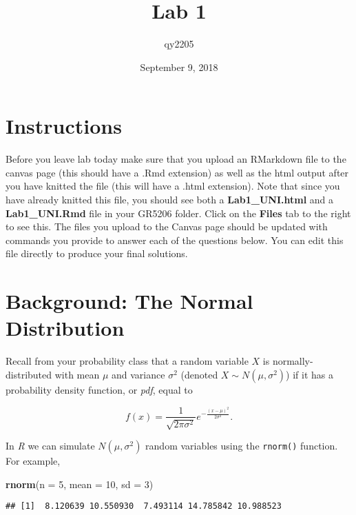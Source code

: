 \documentclass[]{article}
\title{Lab 1}
\author{qy2205}
\date{September 9, 2018}
\newenvironment{Shaded}{\begin{snugshade}}{\end{snugshade}}
\newcommand{\KeywordTok}[1]{\textcolor[rgb]{0.13,0.29,0.53}{\textbf{#1}}}
\newcommand{\DataTypeTok}[1]{\textcolor[rgb]{0.13,0.29,0.53}{#1}}
\newcommand{\DecValTok}[1]{\textcolor[rgb]{0.00,0.00,0.81}{#1}}
\newcommand{\NormalTok}[1]{#1}
\begin{document}
\maketitle

\section{Instructions}\label{instructions}

Before you leave lab today make sure that you upload an RMarkdown file
to the canvas page (this should have a .Rmd extension) as well as the
html output after you have knitted the file (this will have a .html
extension). Note that since you have already knitted this file, you
should see both a \textbf{Lab1\_UNI.html} and a \textbf{Lab1\_UNI.Rmd}
file in your GR5206 folder. Click on the \textbf{Files} tab to the right
to see this. The files you upload to the Canvas page should be updated
with commands you provide to answer each of the questions below. You can
edit this file directly to produce your final solutions.

\section{Background: The Normal
Distribution}\label{background-the-normal-distribution}

Recall from your probability class that a random variable \(X\) is
normally-distributed with mean \(\mu\) and variance \(\sigma^2\)
(denoted \(X \sim N(\mu, \sigma^2)\)) if it has a probability density
function, or \emph{pdf}, equal to

\[f(x) = \frac{1}{\sqrt{2\pi \sigma^2}} e^{-\frac{(x - \mu)^2}{2\sigma^2}}.\]

In \emph{R} we can simulate \(N(\mu, \sigma^2)\) random variables using
the \texttt{rnorm()} function. For example,

\begin{Shaded}
\begin{Highlighting}[]
\KeywordTok{rnorm}\NormalTok{(}\DataTypeTok{n =} \DecValTok{5}\NormalTok{, }\DataTypeTok{mean =} \DecValTok{10}\NormalTok{, }\DataTypeTok{sd =} \DecValTok{3}\NormalTok{)}
\end{Highlighting}
\end{Shaded}

\begin{verbatim}
## [1]  8.120639 10.550930  7.493114 14.785842 10.988523
\end{verbatim}
\end{document}

